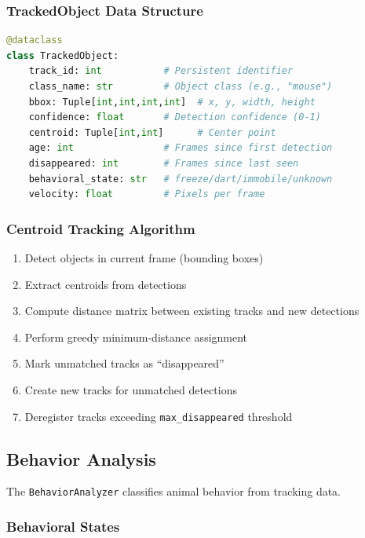 \documentclass[11pt,a4paper]{article}
\begin{document}
\subsubsection{TrackedObject Data Structure}

\begin{lstlisting}[language=Python]
@dataclass
class TrackedObject:
    track_id: int           # Persistent identifier
    class_name: str         # Object class (e.g., "mouse")
    bbox: Tuple[int,int,int,int]  # x, y, width, height
    confidence: float       # Detection confidence (0-1)
    centroid: Tuple[int,int]      # Center point
    age: int                # Frames since first detection
    disappeared: int        # Frames since last seen
    behavioral_state: str   # freeze/dart/immobile/unknown
    velocity: float         # Pixels per frame
\end{lstlisting}

\subsubsection{Centroid Tracking Algorithm}

\begin{enumerate}    \item Detect objects in current frame (bounding boxes)
    \item Extract centroids from detections
    \item Compute distance matrix between existing tracks and new detections
    \item Perform greedy minimum-distance assignment
    \item Mark unmatched tracks as ``disappeared''
    \item Create new tracks for unmatched detections
    \item Deregister tracks exceeding \texttt{max\_disappeared} threshold
\end{enumerate}

\subsection{Behavior Analysis}

The \texttt{BehaviorAnalyzer} classifies animal behavior from tracking data.

\subsubsection{Behavioral States}
\end{document}
